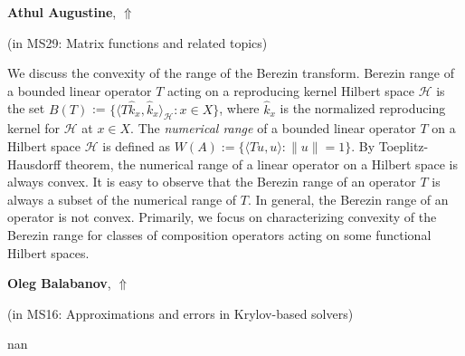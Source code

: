 \documentclass[ILAS2025-program.tex]{subfiles}
\begin{document}
\hypertarget{down0158}{}\begin{ilasabstract}
    
\textbf{Athul Augustine},  \hfill \hyperlink{up0158}{$\Uparrow$}
    
    
(in {\color{mstitle}MS29: Matrix functions and related topics})
        
\mtskip
    We discuss the convexity of the range of the Berezin transform. Berezin range of a bounded linear operator $T$ acting on a reproducing kernel Hilbert space $\mathcal{H}$ is the set $B(T)$ := $\{\langle T\hat{k}_{x},\hat{k}_{x} \rangle_{\mathcal{H}} : x \in X\}$, where $\hat{k}_{x}$ is the normalized reproducing kernel for $\mathcal{H}$ at $x \in X$. The \textit{numerical range} of a bounded linear operator $T$ on a Hilbert space $\mathcal{H}$ is defined as $W(A):= \{\langle Tu,u\rangle : \|u\| = 1 \}.$ By Toeplitz-Hausdorff theorem, the numerical range of a linear operator on a Hilbert space is always convex.  It is easy to observe that the Berezin range of an operator $T$ is always a subset of the numerical range of $T$. In general, the Berezin range of an operator is not convex. Primarily, we focus on characterizing 
convexity of the Berezin range for classes of composition operators acting on some functional Hilbert spaces.

\end{ilasabstract}
    

\hypertarget{down0344}{}\begin{ilasabstract}
    
\textbf{Oleg Balabanov},  \hfill \hyperlink{up0344}{$\Uparrow$}
    
    
(in {\color{mstitle}MS16: Approximations and errors in Krylov-based solvers})
        
\mtskip
    nan
\end{ilasabstract}
    
\end{document}
